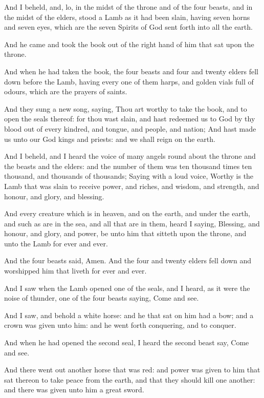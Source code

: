 \Verse And I beheld, and, lo, in the midst of the throne and of the four beasts, and in the midst of the elders, stood a Lamb as it had been slain, having seven horns and seven eyes, which are the seven Spirits of God sent forth into all the earth.

\Verse And he came and took the book out of the right hand of him that sat upon the throne.

\Verse And when he had taken the book, the four beasts and four and twenty elders fell down before the Lamb, having every one of them harps, and golden vials full of odours, which are the prayers of saints.

\Verse And they sung a new song, saying, Thou art worthy to take the book, and to open the seals thereof: for thou wast slain, and hast redeemed us to God by thy blood out of every kindred, and tongue, and people, and nation; \Verse And hast made us unto our God kings and priests: and we shall reign on the earth.

\Verse And I beheld, and I heard the voice of many angels round about the throne and the beasts and the elders: and the number of them was ten thousand times ten thousand, and thousands of thousands; \Verse Saying with a loud voice, Worthy is the Lamb that was slain to receive power, and riches, and wisdom, and strength, and honour, and glory, and blessing.

\Verse And every creature which is in heaven, and on the earth, and under the earth, and such as are in the sea, and all that are in them, heard I saying, Blessing, and honour, and glory, and power, be unto him that sitteth upon the throne, and unto the Lamb for ever and ever.

\Verse And the four beasts said, Amen. And the four and twenty elders fell down and worshipped him that liveth for ever and ever.

\Chapter
\Verse And I saw when the Lamb opened one of the seals, and I heard, as it were the noise of thunder, one of the four beasts saying, Come and see.

\Verse And I saw, and behold a white horse: and he that sat on him had a bow; and a crown was given unto him: and he went forth conquering, and to conquer.

\Verse And when he had opened the second seal, I heard the second beast say, Come and see.

\Verse And there went out another horse that was red: and power was given to him that sat thereon to take peace from the earth, and that they should kill one another: and there was given unto him a great sword.

